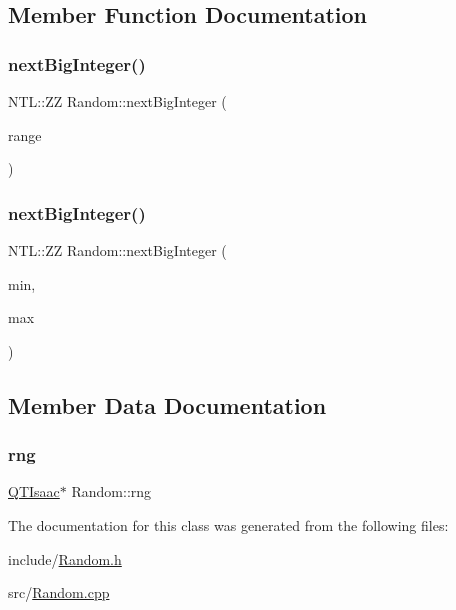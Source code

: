 \subsection{Member Function Documentation}
\mbox{\label{classRandom_a5347f94bb53028350ad9f46c375aae45}} 
\subsubsection{\texorpdfstring{next\+Big\+Integer()}{nextBigInteger()}\hspace{0.1cm}{\footnotesize\ttfamily [1/2]}}
{\footnotesize\ttfamily N\+T\+L\+::\+ZZ Random\+::next\+Big\+Integer (\begin{DoxyParamCaption}\item[{N\+T\+L\+::\+ZZ \&}]{range }\end{DoxyParamCaption})}

\mbox{\label{classRandom_a1d267162c75edb3792dcf29f3125f265}} 
\subsubsection{\texorpdfstring{next\+Big\+Integer()}{nextBigInteger()}\hspace{0.1cm}{\footnotesize\ttfamily [2/2]}}
{\footnotesize\ttfamily N\+T\+L\+::\+ZZ Random\+::next\+Big\+Integer (\begin{DoxyParamCaption}\item[{N\+T\+L\+::\+ZZ \&}]{min,  }\item[{N\+T\+L\+::\+ZZ \&}]{max }\end{DoxyParamCaption})}



\subsection{Member Data Documentation}
\mbox{\label{classRandom_ac7e446b9b431641c729a6d78ab747781}} 
\subsubsection{\texorpdfstring{rng}{rng}}
{\footnotesize\ttfamily \hyperlink{classQTIsaac}{Q\+T\+Isaac}$\ast$ Random\+::rng\hspace{0.3cm}{\ttfamily [private]}}



The documentation for this class was generated from the following files\+:\begin{DoxyCompactItemize}
\item 
include/\hyperlink{Random_8h}{Random.\+h}\item 
src/\hyperlink{Random_8cpp}{Random.\+cpp}\end{DoxyCompactItemize}
